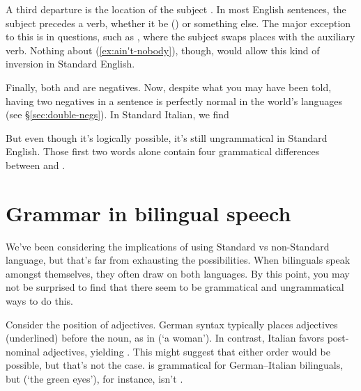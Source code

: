 A third departure is the location of the subject . In most English sentences, the subject precedes a verb, whether it be  () or something else. The major exception to this is in questions, such as , where the subject swaps places with the auxiliary verb. Nothing about (\ref{ex:ain't-nobody}), though, would allow this kind of inversion in Standard English.

Finally, both  and  are negatives. Now, despite what you may have been told, having two negatives in a sentence is perfectly normal in the world's languages (see \S\ref{sec:double-negs}).%
In Standard Italian, we find


\z

But even though it's logically possible, it's still ungrammatical in Standard English. Those first two words alone contain four grammatical differences between  and .



\section{Grammar in bilingual speech}

We've been considering the implications of using Standard vs non-Standard language, but that's far from exhausting the possibilities. When bilinguals speak amongst themselves, they often draw on both languages. By this point, you may not be surprised to find that there seem to be grammatical and ungrammatical ways to do this.

Consider the position of adjectives. German syntax typically places adjectives (underlined) before the noun, as in  (`a  woman'). In contrast, Italian favors post-nominal adjectives, yielding . This might suggest that either order would be possible, but that's not the case.  is grammatical for German--Italian bilinguals, but  (`the green eyes'), for instance, isn't \citep{Cantone2009}.

